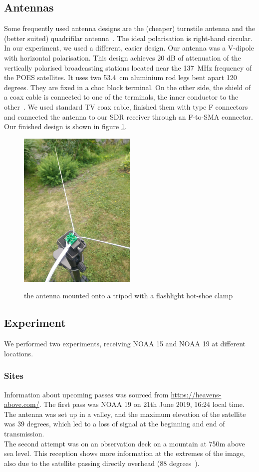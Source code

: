 \documentclass[conference]{IEEEtran}
\begin{document}
\subsection{Antennas} \label{sec:NOAAantennas}
Some frequently used antenna designs are the (cheaper) turnstile antenna and the (better suited) quadrifilar antenna~\cite[45]{NOAA19building}. The ideal polarisation is right-hand circular.\\
In our experiment, we used a different, easier design. Our antenna was a V-dipole with horizontal polarisation. This design achieves 20 dB of attenuation of the vertically polarised broadcasting stations located near the 137~MHz frequency of the POES satellites. It uses two 53.4~cm aluminium rod legs bent apart 120 degrees. They are fixed in a choc block terminal. On the other side, the shield of a coax cable is connected to one of the terminals, the inner conductor to the other~\cite{Adam15antenna}. We used standard TV coax cable, finished them with type F connectors and connected the antenna to our SDR receiver through an F-to-SMA connector. Our finished design is shown in figure \ref{fig:vdipolefinished}.
\begin{figure}
	\centering
	\caption{the antenna mounted onto a tripod with a flashlight hot-shoe clamp}
	\includegraphics[width=0.5\textwidth]{v-dipole-finished} \label{fig:vdipolefinished}
\end{figure}
\subsection{Experiment}
We performed two experiments, receiving NOAA 15 and NOAA 19 at different locations.
\subsubsection{Sites}
Information about upcoming passes was sourced from \url{https://heavens-above.com/}. The first pass was NOAA 19 on 21th June 2019, 16:24 local time. The antenna was set up in a valley, and the maximum elevation of the satellite was 39 degrees, which led to a loss of signal at the beginning and end of transmission.\\
The second attempt was on an observation deck on a mountain at 750m above sea level. This reception shows more information at the extremes of the image, also due to the satellite passing directly overhead (88 degrees~\cite{heavensabove19noaa15}).\\
\end{document}
